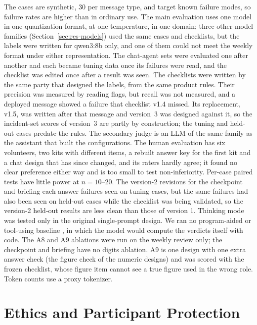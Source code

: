 \documentclass[10pt,twocolumn]{article}
\begin{document}
The cases are synthetic, 30 per message type, and target known failure modes, so failure rates are higher than in
ordinary use. The main evaluation uses one model in one quantization format, at one temperature, in one domain; three other model
families (Section~\ref{sec:res-models}) used the same cases and checklists, but the labels were written for qwen3:8b only, and one of
them could not meet the weekly format under either representation. The chat-agent sets were evaluated one after another
and each became tuning data once its failures were read, and the checklist was edited once after a result was seen. The checklists
were written by the same party that designed the labels, from the same product rules. Their precision was measured
by reading flags, but recall was not measured, and a deployed message showed a failure that checklist v1.4 missed. Its
replacement, v1.5, was written after that message and version~3 was designed against it, so the incident-set scores of
version~3 are partly by construction; the tuning and held-out cases predate the rules. The secondary judge is an LLM of the same family as the assistant that
built the configurations. The human evaluation has six volunteers, two kits with different items, a rebuilt answer
key for the first kit and a chat design that has since changed, and its raters hardly agree; it found no clear
preference either way and is too small to test non-inferiority. Per-case paired tests have little power at $n=10$--$20$.
The version-2 revisions for the checkpoint and briefing each answer failures seen on tuning cases, but the same failures
had also been seen on held-out cases while the checklist was being validated, so the version-2 held-out results are
less clean than those of version 1. Thinking mode was tested only in the original single-prompt design. We ran no program-aided or tool-using baseline
\citep{gao2023pal,schick2023toolformer}, in which the model would compute the verdicts itself with code. The A8 and A9
ablations were run on the weekly review only; the checkpoint and briefing have no digits ablation. A9 is one design
with one extra answer check (the figure check of the numeric designs) and was scored with the frozen checklist, whose
figure item cannot see a true figure used in the wrong role. Token
counts use a proxy tokenizer.

\section{Ethics and Participant Protection}
\end{document}
